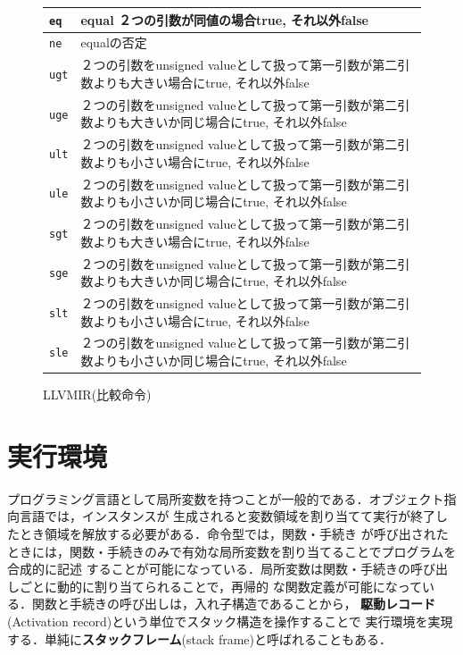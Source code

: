 \documentclass[dvipdfmx,a4j]{jbook}
\begin{document}
\begin{figure}[H]
\begin{center}
  {\scriptsize
\begin{tabularx}{\textwidth}{|l|X|}\hline
{\tt eq} & 
equal ２つの引数が同値の場合true, それ以外false\\\hline
{\tt ne} & equalの否定\\\hline
{\tt ugt} & ２つの引数をunsigned valueとして扱って第一引数が第二引数よりも大きい場合にtrue, それ以外false\\\hline
{\tt uge} & ２つの引数をunsigned valueとして扱って第一引数が第二引数よりも大きいか同じ場合にtrue, それ以外false\\\hline
{\tt ult} & ２つの引数をunsigned valueとして扱って第一引数が第二引数よりも小さい場合にtrue, それ以外false\\\hline
{\tt ule} & ２つの引数をunsigned valueとして扱って第一引数が第二引数よりも小さいか同じ場合にtrue, それ以外false\\\hline
{\tt sgt} & ２つの引数をunsigned valueとして扱って第一引数が第二引数よりも大きい場合にtrue, それ以外false\\\hline
{\tt sge} & ２つの引数をunsigned valueとして扱って第一引数が第二引数よりも大きいか同じ場合にtrue, それ以外false\\\hline
{\tt slt} & ２つの引数をunsigned valueとして扱って第一引数が第二引数よりも小さい場合にtrue, それ以外false\\\hline
{\tt sle} & ２つの引数をunsigned valueとして扱って第一引数が第二引数よりも小さいか同じ場合にtrue, それ以外false\\\hline
\end{tabularx}
}
\end{center}
\caption{LLVMIR(比較命令)}
\end{figure}

\section{実行環境}

プログラミング言語として局所変数を持つことが一般的である．オブジェクト指向言語では，インスタンスが
生成されると変数領域を割り当てて実行が終了したとき領域を解放する必要がある．命令型では，関数・手続き
が呼び出されたときには，関数・手続きのみで有効な局所変数を割り当てることでプログラムを合成的に記述
することが可能になっている．局所変数は関数・手続きの呼び出しごとに動的に割り当てられることで，再帰的
な関数定義が可能になっている．関数と手続きの呼び出しは，入れ子構造であることから，
{\bf 駆動レコード}(Activation record)という単位でスタック構造を操作することで
実行環境を実現する．単純に{\bf スタックフレーム}(stack frame)と呼ばれることもある．
\end{document}
